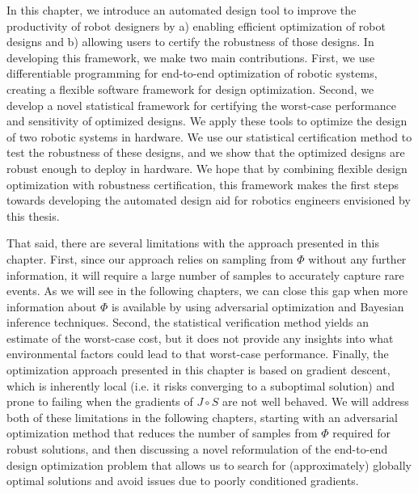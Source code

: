 In this chapter, we introduce an automated design tool to improve the productivity of robot designers by a) enabling efficient optimization of robot designs and b) allowing users to certify the robustness of those designs. In developing this framework, we make two main contributions. First, we use differentiable programming for end-to-end optimization of robotic systems, creating a flexible software framework for design optimization. Second, we develop a novel statistical framework for certifying the worst-case performance and sensitivity of optimized designs.
%
We apply these tools to optimize the design of two robotic systems in hardware. We use our statistical certification method to test the robustness of these designs, and we show that the optimized designs are robust enough to deploy in hardware. We hope that by combining flexible design optimization with robustness certification, this framework makes the first steps towards developing the automated design aid for robotics engineers envisioned by this thesis.

That said, there are several limitations with the approach presented in this chapter. First, since our approach relies on sampling from $\Phi$ without any further information, it will require a large number of samples to accurately capture rare events. As we will see in the following chapters, we can close this gap when more information about $\Phi$ is available by using adversarial optimization and Bayesian inference techniques. Second, the statistical verification method yields an estimate of the worst-case cost, but it does not provide any insights into what environmental factors could lead to that worst-case performance. Finally, the optimization approach presented in this chapter is based on gradient descent, which is inherently local (i.e. it risks converging to a suboptimal solution) and prone to failing when the gradients of $J\circ S$ are not well behaved. We will address both of these limitations in the following chapters, starting with an adversarial optimization method that reduces the number of samples from $\Phi$ required for robust solutions, and then discussing a novel reformulation of the end-to-end design optimization problem that allows us to search for (approximately) globally optimal solutions and avoid issues due to poorly conditioned gradients.